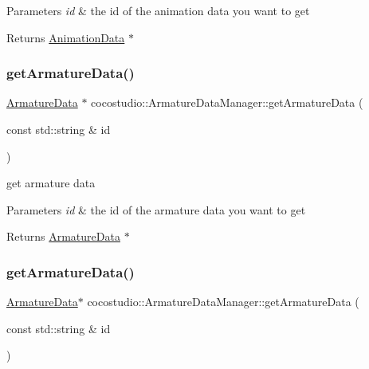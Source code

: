 \begin{DoxyParams}{Parameters}
{\em id} & the id of the animation data you want to get \\
\hline
\end{DoxyParams}
\begin{DoxyReturn}{Returns}
\hyperlink{classcocostudio_1_1AnimationData}{Animation\+Data} $\ast$ 
\end{DoxyReturn}
\mbox{\label{classcocostudio_1_1ArmatureDataManager_a8ae85e5c414861b3ca843d9497e27cb1}} 
\subsubsection{\texorpdfstring{get\+Armature\+Data()}{getArmatureData()}\hspace{0.1cm}{\footnotesize\ttfamily [1/2]}}
{\footnotesize\ttfamily \hyperlink{classcocostudio_1_1ArmatureData}{Armature\+Data} $\ast$ cocostudio\+::\+Armature\+Data\+Manager\+::get\+Armature\+Data (\begin{DoxyParamCaption}\item[{const std\+::string \&}]{id }\end{DoxyParamCaption})}



get armature data 


\begin{DoxyParams}{Parameters}
{\em id} & the id of the armature data you want to get \\
\hline
\end{DoxyParams}
\begin{DoxyReturn}{Returns}
\hyperlink{classcocostudio_1_1ArmatureData}{Armature\+Data} $\ast$ 
\end{DoxyReturn}
\mbox{\label{classcocostudio_1_1ArmatureDataManager_a19d1df9bd2bfa449ac9187450d17ad1b}} 
\subsubsection{\texorpdfstring{get\+Armature\+Data()}{getArmatureData()}\hspace{0.1cm}{\footnotesize\ttfamily [2/2]}}
{\footnotesize\ttfamily \hyperlink{classcocostudio_1_1ArmatureData}{Armature\+Data}$\ast$ cocostudio\+::\+Armature\+Data\+Manager\+::get\+Armature\+Data (\begin{DoxyParamCaption}\item[{const std\+::string \&}]{id }\end{DoxyParamCaption})}



